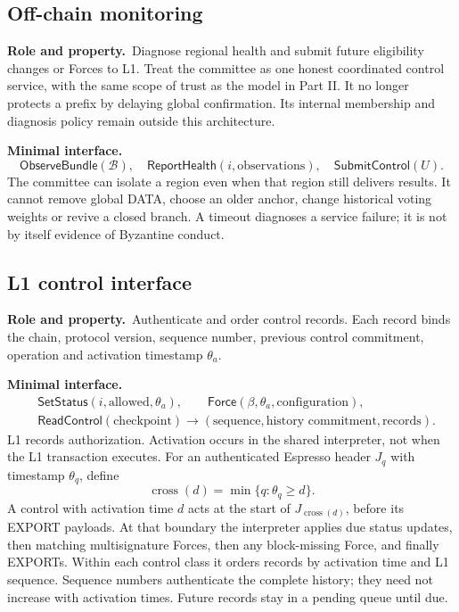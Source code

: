 \documentclass[11pt,a4paper]{article}
\newcommand{\api}[1]{\ensuremath{\mathsf{#1}}}
\newcommand{\role}{\textbf{Role and property.}\ }
\newcommand{\iface}{\textbf{Minimal interface.}\ }
\begin{document}
\subsection{Off-chain monitoring}
\role Diagnose regional health and submit future eligibility changes or
Forces to L1. Treat the committee as one honest coordinated control
service, with the same scope of trust as the model in Part II. It no
longer protects a prefix by delaying global confirmation. Its internal
membership and diagnosis policy remain outside this architecture.

\iface
\[
 \api{ObserveBundle}(\mathcal B),\quad
 \api{ReportHealth}(i,\text{observations}),\quad
 \api{SubmitControl}(U).
\]
The committee can isolate a region even when that region still delivers
results. It cannot remove global DATA, choose an older anchor, change
historical voting weights or revive a closed branch. A timeout diagnoses
a service failure; it is not by itself evidence of Byzantine conduct.

\subsection{L1 control interface}
\role Authenticate and order control records. Each record binds the
chain, protocol version, sequence number, previous control commitment,
operation and activation timestamp $\theta_a$.

\iface
\[
\begin{aligned}
 &\api{SetStatus}(i,\text{allowed},\theta_a),\qquad
   \api{Force}(\beta,\theta_a,\text{configuration}),\\
 &\api{ReadControl}(\text{checkpoint})\to
   (\text{sequence},\text{history commitment},\text{records}).
\end{aligned}
\]
L1 records authorization. Activation occurs in the shared interpreter,
not when the L1 transaction executes. For an authenticated Espresso
header $J_q$ with timestamp $\theta_q$, define
\[
 \operatorname{cross}(d)=\min\{q:\theta_q\ge d\}.
\]
A control with activation time $d$ acts at the start of
$J_{\operatorname{cross}(d)}$, before its EXPORT payloads. At that
boundary the interpreter applies due status updates, then matching
multisignature Forces, then any block-missing Force, and finally EXPORTs.
Within each control class it orders records by activation time and L1
sequence. Sequence numbers authenticate the complete history; they need
not increase with activation times. Future records stay in a pending
queue until due.
\end{document}
